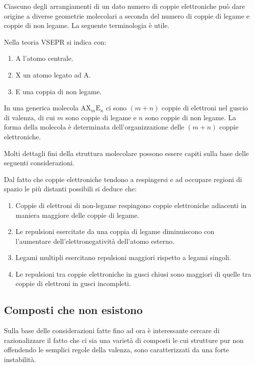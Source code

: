 Ciascuno degli arrangiamenti di un dato numero di coppie elettroniche può dare origine a diverse geometrie molecolari a seconda del numero di coppie di legame e coppie di non legame. La seguente terminologia è utile.
\begin{notz}
    Nella teoria VSEPR si indica con:
    \begin{enumerate}
        \item A l'atomo centrale.
        \item X un atomo legato ad A.
        \item E una coppia di non legame.
    \end{enumerate}
    In una generica molecola $\text{AX}_m\text{E}_n$ ci sono $(m+n)$ coppie di elettroni nel guscio di valenza, di cui $m$ sono coppie di legame e $n$ sono coppie di non legame. La forma della molecola è determinata dell'organizzazione delle $(m+n)$ coppie elettroniche.
\end{notz}
Molti dettagli fini della struttura molecolare possono essere capiti sulla base delle seguenti considerazioni. 
\begin{corl}
Dal fatto che coppie elettroniche tendono a respingersi e ad occupare regioni di spazio le più distanti possibili si deduce che:
    \begin{enumerate}
        \item Coppie di elettroni di non-legame respingono coppie elettroniche adiacenti in maniera maggiore delle
        coppie di legame. 
        \item Le repulsioni esercitate da una coppia di legame diminuiscono con l'aumentare dell'elettronegatività
        dell'atomo esterno. 
        \item Legami multipli esercitano repulsioni maggiori rispetto a legami singoli. 
        \item Le repulsioni tra coppie elettroniche in gusci chiusi sono maggiori di quelle tra coppie di elettroni in
        gusci incompleti.
    \end{enumerate}
\end{corl}

\subsection{Composti che non esistono}
Sulla base delle considerazioni fatte fino ad ora è interessante cercare di razionalizzare il fatto che ci sia una varietà di composti le cui strutture pur non offendendo le semplici regole della valenza, sono caratterizzati da una forte instabilità.

